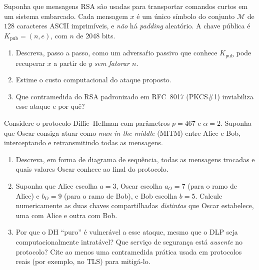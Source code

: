\documentclass[12pt,a4paper]{article}
\begin{document}
\begin{exercicio}
Suponha que mensagens RSA s\~{a}o usadas para transportar comandos curtos em um sistema embarcado. Cada mensagem $x$ \'{e} um \'{u}nico s\'{i}mbolo do conjunto $\mathcal{M}$ de $128$ caracteres ASCII imprim\'{i}veis, e \emph{n\~{a}o} h\'{a} \emph{padding} aleat\'{o}rio. A chave p\'{u}blica \'{e} $K_{\text{pub}} = (n, e)$, com $n$ de $2048$ bits.
\begin{enumerate}[label=(\alph*)]
    \item Descreva, passo a passo, como um adversa\'{r}io passivo que conhece $K_{\text{pub}}$ pode recuperar $x$ a partir de $y$ \emph{sem fatorar $n$}.
    \item Estime o custo computacional do ataque proposto.
    \item Que contramedida do RSA padronizado em RFC~8017 (PKCS\#1) inviabiliza esse ataque e por qu\^{e}?
\end{enumerate}
\end{exercicio}

\begin{exercicio}
Considere o protocolo Diffie--Hellman com par\^{a}metros $p = 467$ e $\alpha = 2$. Suponha que Oscar consiga atuar como \emph{man-in-the-middle} (MITM) entre Alice e Bob, interceptando e retransmitindo todas as mensagens.
\begin{enumerate}[label=(\alph*)]
    \item Descreva, em forma de diagrama de sequ\^{e}ncia, todas as mensagens trocadas e quais valores Oscar conhece ao final do protocolo.
    \item Suponha que Alice escolha $a = 3$, Oscar escolha $a_O = 7$ (para o ramo de Alice) e $b_O = 9$ (para o ramo de Bob), e Bob escolha $b = 5$. Calcule numericamente as duas chaves compartilhadas \emph{distintas} que Oscar estabelece, uma com Alice e outra com Bob.
    \item Por que o DH ``puro'' \'{e} vulner\'{a}vel a esse ataque, mesmo que o DLP seja computacionalmente intrat\'{a}vel? Que servi\c{c}o de seguran\c{c}a est\'{a} \emph{ausente} no protocolo? Cite ao menos uma contramedida pr\'{a}tica usada em protocolos reais (por exemplo, no TLS) para mitig\'{a}-lo.
\end{enumerate}
\end{exercicio}
\end{document}
